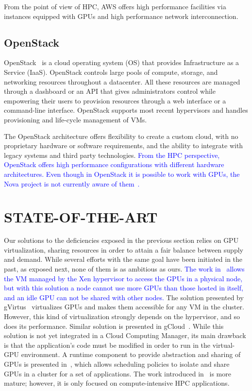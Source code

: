 \documentclass[a4paper,twoside]{article}
\begin{document}
From the point of view of HPC, AWS offers high performance facilities via 
instances equipped with GPUs and high performance network interconnection.

\subsection{OpenStack}
\label{sec:openstack}

OpenStack~\cite{OpenStack} is a cloud operating system (OS) that provides Infrastructure as a Service (IaaS). 
OpenStack controls large pools of compute, storage, and networking resources throughout a 
datacenter. All these resources are managed through a dashboard or an API that gives administrators 
control while empowering their users to provision resources through a web interface
or a command-line interface.  
OpenStack supports most recent hypervisors and handles provisioning 
and life-cycle management of VMs.
 
The OpenStack architecture offers flexibility to create a custom cloud, with no proprietary hardware
or software requirements, and the ability to integrate with legacy systems and third party technologies. 
\textcolor{blue}{
From the HPC perspective, OpenStack offers high performance configurations with different hardware architectures. 
Even though in OpenStack it is possible to work with GPUs, the Nova project is not currently aware of them~\cite{OpenStackGPU}. 
}

\section{\uppercase{State-of-the-Art}}
\label{sec:state}
Our solutions to the deficiencies exposed in the previous section relies on GPU virtualization, sharing resources in order
to attain a fair balance between supply and demand. 
While several efforts with the same goal have been initiated in the past, as exposed next, 
none of them is as ambitious as ours. 
\textcolor{blue}{
The work in~\cite{younge2013enabling} allows the VM managed
by the Xen hypervisor to access the GPUs in a physical
node, but with this solution a node cannot 
use more GPUs than those hosted in itself, and an idle GPU can not be shared with other nodes. }
The solution presented by gVirtus~\cite{gvirtus} virtualizes GPUs and makes
them accessible for any VM in the cluster. However, this kind
of virtualization strongly depends on the hypervisor, and so
does its performance. Similar solution is presented in gCloud~\cite{diab2013dynamic}. 
While this solution is not yet integrated in a Cloud Computing Manager, its main
drawback is that the application's code must be modified
in order to run in the virtual-GPU environment. A runtime component to provide abstraction
and sharing of GPUs is presented in~\cite{becchi2012virtual}, which allows scheduling policies 
to isolate and share GPUs in a cluster for a set of applications. 
The work introduced in~\cite{jungpgpu} is more mature; however,
it is only focused on compute-intensive HPC applications. 
\end{document}
